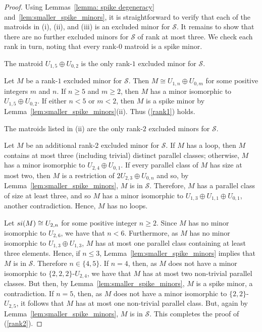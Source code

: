 \documentclass[10pt,a4paper]{amsart}
\newcommand{\cS}{\mathcal{S}}
\newcommand{\si}{{\rm si}}
\begin{document}
\begin{proof}
Using Lemmas~\ref{lemma: spike degeneracy} and~\ref{lem:smaller_spike_minors}, it is straightforward to verify that each of the matroids in (i), (ii), and (iii) is an excluded minor for $\cS$. It remains to show that there are no further excluded minors for $\cS$ of rank at most three. We check each rank in turn, noting that every rank-$0$ matroid is a spike minor.

\begin{sublemma}
The matroid $U_{1,5} \oplus U_{0,2}$ is the only rank-$1$ excluded minor for $\cS$.
\label{rank1}
\end{sublemma}

Let $M$ be a rank-$1$ excluded minor for $\cS$. Then $M\cong U_{1, n}\oplus U_{0, m}$ for some positive integers $m$ and $n$. If $n\geq 5$ and $m\geq 2$, then $M$ has a minor isomorphic to $U_{1,5} \oplus U_{0,2}$. If either $n < 5$ or $m < 2$, then $M$ is a spike minor by Lemma~\ref{lem:smaller_spike_minors}(ii). Thus (\ref{rank1}) holds.

\begin{sublemma}
The matroids listed in (ii) are the only rank-$2$ excluded minors for $\cS$.
\label{rank2}
\end{sublemma}

Let $M$ be an additional rank-$2$ excluded minor for $\cS$. If $M$ has a loop, then $M$ contains at most three (including trivial) distinct parallel classes; otherwise, $M$ has a minor isomorphic to $U_{2,4} \oplus U_{0,1}$. If every parallel class of $M$ has size at most two, then $M$ is a restriction of $2U_{2, 3}\oplus U_{0, n}$ and so, by Lemma~\ref{lem:smaller_spike_minors}, $M$ is in $\cS$. Therefore, $M$ has a parallel class of size at least three, and so $M$ has a minor isomorphic to $U_{1, 3}\oplus U_{1, 1}\oplus U_{0,1}$, another contradiction. Hence, $M$ has no loops.

Let $\si(M)\cong U_{2, n}$ for some positive integer $n\ge 2$. Since $M$ has no minor isomorphic to $U_{2, 6}$, we have that $n < 6$. Furthermore, as $M$ has no minor isomorphic to $U_{1,3} \oplus U_{1,3}$, $M$ has at most one parallel class containing at least three elements. Hence, if $n \leq 3$, Lemma~\ref{lem:smaller_spike_minors} implies that $M$ is in $\cS$. Therefore $n\in \{4, 5\}$. If $n = 4$, then, as $M$ does not have a minor isomorphic to $\{2,2,2\}$-$U_{2, 4}$, we have that $M$ has at most two non-trivial parallel classes. But then, by Lemma~\ref{lem:smaller_spike_minors}, $M$ is a spike minor, a contradiction. If $n = 5$, then, as $M$ does not have a minor isomorphic to $\{2, 2\}$-$U_{2, 5}$, it follows that $M$ has at most one non-trivial parallel class. But, again by Lemma~\ref{lem:smaller_spike_minors}, $M$ is in $\cS$. This completes the proof of (\ref{rank2}).


\end{proof}
\end{document}
